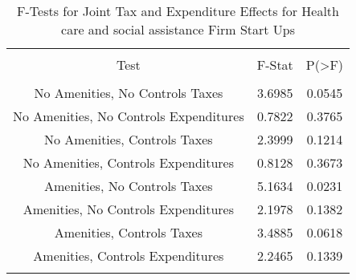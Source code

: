 
\begin{table}[!htbp] \centering 
  \caption{F-Tests for Joint Tax and Expenditure Effects for Health care and social assistance Firm Start Ups} 
  \label{62Ftests} 
\begin{tabular}{@{\extracolsep{5pt}} ccc} 
\\[-1.8ex]\hline 
\hline \\[-1.8ex] 
Test & F-Stat & P(\textgreater F) \\ 
\hline \\[-1.8ex] 
No Amenities, No Controls Taxes & 3.6985 & 0.0545 \\ 
No Amenities, No Controls Expenditures & 0.7822 & 0.3765 \\ 
No Amenities, Controls Taxes & 2.3999 & 0.1214 \\ 
No Amenities, Controls Expenditures & 0.8128 & 0.3673 \\ 
Amenities, No Controls Taxes & 5.1634 & 0.0231 \\ 
Amenities, No Controls Expenditures & 2.1978 & 0.1382 \\ 
Amenities, Controls Taxes & 3.4885 & 0.0618 \\ 
Amenities, Controls Expenditures & 2.2465 & 0.1339 \\ 
\hline \\[-1.8ex] 
\end{tabular} 
\end{table} 
